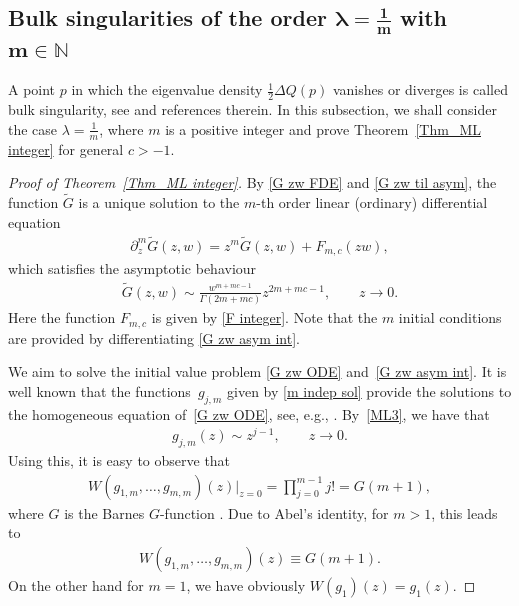\subsection[Bulk singularities of the order lambda=1/m with m in N]{Bulk singularities of the order $\boldsymbol{\lambda=\frac1m}$ with $\boldsymbol{m\in \mathbb{N}}$}

A point $p$ in which the eigenvalue density $\frac12\Delta Q(p)$ vanishes or diverges is called bulk singularity, see \cite{ameur2018random} and references therein. In this subsection, we shall consider the case $\lambda=\frac1m$, where $m$ is a positive integer and prove Theorem~\ref{Thm_ML integer} for general $c>-1$.

\begin{proof}[Proof of Theorem~\ref{Thm_ML integer}]
	By \eqref{G zw FDE} and \eqref{G zw til asym}, the function $\widetilde{G}$ is a unique solution to the $m$-th order linear (ordinary) differential equation
	\begin{gather} \label{G zw ODE}
		\partial_z ^m \widetilde{G}(z,w)=z^m \widetilde{G}(z,w)+F_{m,c}(zw),
	\end{gather}
	which satisfies the asymptotic behaviour
	\begin{gather} \label{G zw asym int}
		\widetilde{G}(z,w) \sim \frac{w^{m+mc-1}}{ \Gamma(2m+mc) } z^{2m+mc-1},\qquad z \to 0.
	\end{gather}
	Here the function $F_{m,c}$ is given by \eqref{F integer}. Note that the $m$ initial conditions are provided by differentiating \eqref{G zw asym int}.
	
We aim to solve the initial value problem \eqref{G zw ODE} and~\eqref{G zw asym int}.
	It is well known that the functions~$g_{j,m}$ given by \eqref{m indep sol} provide the solutions to the homogeneous equation of~\eqref{G zw ODE}, see, e.g., \cite[Theorem~5.18]{gorenflo2014mittag}.
	By~\eqref{ML3}, we have that
	\begin{gather} \label{gj asymp}
		g_{j,m}(z) \sim z^{j-1} ,\qquad z \to 0.
	\end{gather}
	Using this, it is easy to observe that
	\begin{gather*}
		W(g_{1,m},\dots,g_{m,m})(z)|_{z=0}=\prod_{j=0}^{m-1} j!=G(m+1),
	\end{gather*}
	where $G$ is the Barnes $G$-function \cite[Section~5.17]{olver2010nist}. Due to Abel's identity, for $m>1$, this leads to
	\begin{gather} \label{Wronskian g1m}
		W(g_{1,m},\dots,g_{m,m})(z) \equiv G(m+1).
	\end{gather}
	On the other hand for $m=1$, we have obviously $W(g_1)(z)=g_1(z).$
	

\end{proof}
